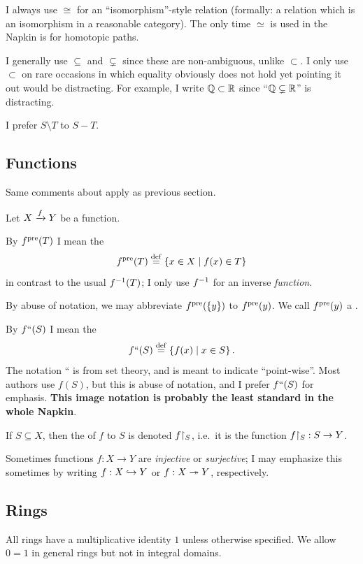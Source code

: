 I always use $\cong$ for an ``isomorphism''-style relation
(formally: a relation which is an isomorphism in a reasonable category).
The only time $\simeq$ is used in the Napkin is for homotopic paths.

I generally use $\subseteq$ and $\subsetneq$ since these are non-ambiguous,
unlike $\subset$.  I only use $\subset$ on rare occasions in which equality
obviously does not hold yet pointing it out would be distracting.
For example, I write $\mathbb Q \subset \mathbb R$
since ``$\mathbb Q \subsetneq \mathbb R$'' is distracting.

I prefer $S \setminus T$ to $S - T$.

\subsection*{Functions}
Same comments about  apply as previous section.

Let $X \xrightarrow{f} Y$ be a function.

\begin{itemize}
\ii By $f^{\text{pre}}(T)$ I mean the 
\[ f^{\text{pre}}(T) \overset{\mathrm{def}}{=} \left\{ x \in X \mid f(x) \in T \right\} \]
in contrast to the usual $f^{-1}(T)$; I only use $f^{-1}$ for an inverse \emph{function}.

By abuse of notation, we may abbreviate $f^{\text{pre}}(\{y\})$ to $f^{\text{pre}}(y)$.
We call $f^{\text{pre}}(y)$ a .

\ii By $f``(S)$ I mean the 
\[ f``(S) \overset{\mathrm{def}}{=} \left\{ f(x) \mid x \in S \right\}. \]
The notation {``} is from set theory, and is meant to indicate ``point-wise''.
Most authors use $f(S)$, but this is abuse of notation,
and I prefer $f``(S)$ for emphasis.
\textbf{This image notation is probably the least standard in the whole Napkin}.

\ii If $S \subseteq X$, then the  of $f$ to $S$
is denoted $f \restrict{S}$,
i.e.\ it is the function $f \restrict{S} : S \to Y$.

\ii Sometimes functions $f : X \to Y$ are \emph{injective} or \emph{surjective};
I may emphasize this sometimes by writing $f : X \hookrightarrow Y$ or $f : X \twoheadrightarrow Y$, respectively.
\end{itemize}

\subsection*{Rings}
All rings have a multiplicative identity $1$ unless otherwise specified.
We allow $0=1$ in general rings but not in integral domains.

